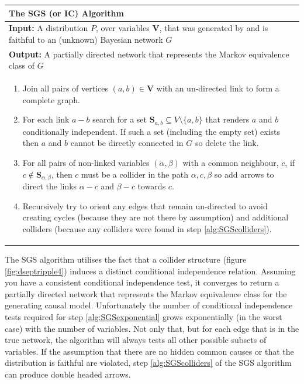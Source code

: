 \documentclass[11pt,a4paper,oneside]{book}
\theoremstyle{plain}
\theoremstyle{definition}
\begin{document}
\begin{table}[H]
 \begin{tabularx}{\textwidth}{X}
 \hline
\rule{0pt}{2.5ex} 
 \textbf{The SGS (or IC) Algorithm}\\
 \hline
 \rule{0pt}{2.5ex}
\textbf{Input:} A distribution $P$, over variables $\boldsymbol{V}$, that was generated by and is faithful to an (unknown) Bayesian network $G$\\
\textbf{Output:} A partially directed network that represents the Markov equivalence class of $G$\\
 \begin{enumerate}[itemsep=8pt]
  \item Join all pairs of vertices $(a,b) \in \boldsymbol{V}$ with an un-directed link to form a complete graph.
  \item For each link $a-b$ search for a set $\boldsymbol{S}_{a,b} \subseteq V \setminus \{a,b\}$ that renders $a$ and $b$ conditionally independent. If such a set (including the empty set) exists then $a$ and $b$ cannot be directly connected in $G$ so delete the link.
  \label{alg:SGSexponential}
  
  \item For all pairs of non-linked variables $(\alpha,\beta)$ with a common neighbour, $c$, if $c \notin \boldsymbol{S}_{\alpha,\beta}$, then $c$ must be a collider in the path $\alpha,c,\beta$ so  add arrows to direct the links $\alpha-c$ and $\beta-c$ towards $c$.
  \label{alg:SGScolliders}  
  \item Recursively try to orient any edges that remain un-directed to avoid creating cycles (because they are not there by assumption) and additional colliders (because any colliders were found in step \ref{alg:SGScolliders}).
  \label{alg:SGSfinal}
\end{enumerate}\\
 \hline
\end{tabularx}
\end{table}

The SGS algorithm utilises the fact that a collider structure (figure \ref{fig:dseptripple4}) induces a distinct conditional independence relation. Assuming you have a consistent conditional independence test, it converges to return a partially directed network that represents the Markov equivalence class for the generating causal model. Unfortunately the number of conditional independence tests required for step \ref{alg:SGSexponential} grows exponentially (in the worst case) with the number of variables. Not only that, but for each edge that is in the true network, the algorithm will always tests all other possible subsets of variables. If the assumption that there are no hidden common causes or that the distribution is faithful are violated, step \ref{alg:SGScolliders} of the SGS algorithm can produce double headed arrows.
\end{document}
